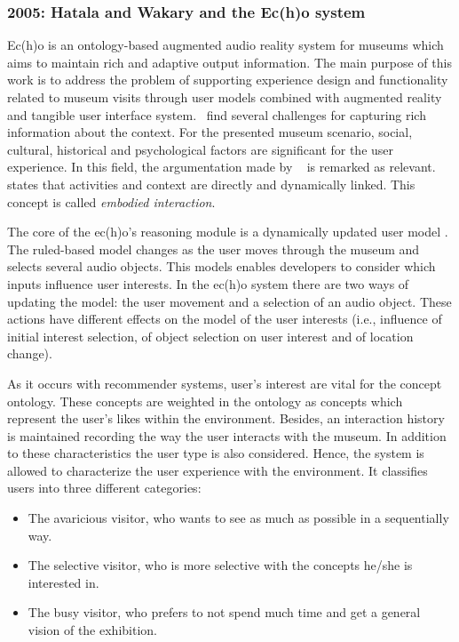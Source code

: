 \subsubsection{2005: Hatala and Wakary and the Ec(h)o system}
\label{sec:hatala}

Ec(h)o is an ontology-based augmented audio reality system for museums which 
aims to maintain rich and adaptive output information. The main purpose of this 
work is to address the problem of supporting experience design and functionality 
related to museum visits through user models combined with augmented reality 
and tangible user interface system.~\citet{hatala_ontology_based_2005} find
several challenges for capturing rich information about the context. For the
presented museum scenario, social, cultural, historical and psychological factors
are significant for the user experience. In this field, the argumentation made by
\citet{dourish_what_2004}~\citep{dourish_where_2004} is remarked as relevant.
\citeauthor{dourish_what_2004} states that activities and context are directly 
and dynamically linked. This concept is called \textit{embodied interaction}.

The core of the ec(h)o's reasoning module is a dynamically updated user model
\citep{wahlster_user_1989}. The ruled-based model changes as the user moves 
through the museum and selects several audio objects. This models enables 
developers to consider which inputs influence user interests. In the ec(h)o 
system there are two ways of updating the model: the user movement and a 
selection of an audio object. These actions have different effects on the model 
of the user interests (i.e., influence of initial interest selection, of object 
selection on user interest and of location change). 

As it occurs with recommender systems, user's interest are vital for the concept
ontology. These concepts are weighted in the ontology as concepts which represent
the user's likes within the environment. Besides, an interaction history is 
maintained recording the way the user interacts with the museum. In addition to 
these characteristics the user type is also considered. Hence, the system is 
allowed to characterize the user experience with the environment. It classifies 
users into three different categories:

\begin{itemize}
  \item The avaricious visitor, who wants to see as much as possible in a 
  sequentially way.
  \item The selective visitor, who is more selective with the concepts he/she is
  interested in.
  \item The busy visitor, who prefers to not spend much time and get a general
  vision of the exhibition.
\end{itemize}
